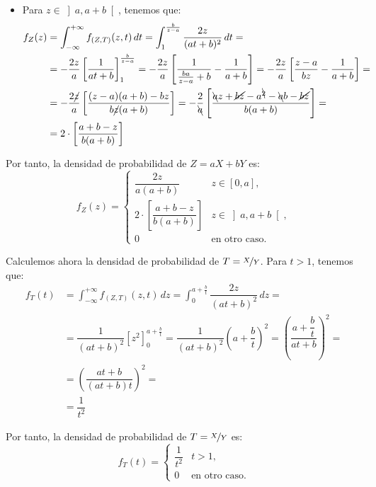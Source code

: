 \begin{ejercicio}
\begin{itemize}
        \item Para $z\in\left]a,a+b\right[$, tenemos que:
        \begin{align*}
            f_Z(z)&=\int_{-\infty}^{+\infty} f_{(Z,T)}(z, t) \, dt
            = \int_{1}^{\frac{b}{z-a}} \dfrac{2z}{(at+b)^2} \, dt
            =\\&= -\frac{2z}{a}\left[\dfrac{1}{at+b}\right]_{1}^{\frac{b}{z-a}}
            = -\frac{2z}{a}\left[\dfrac{1}{\frac{ba}{z-a}+b}-\dfrac{1}{a+b}\right]
            = -\frac{2z}{a}\left[\dfrac{z-a}{bz}-\dfrac{1}{a+b}\right]
            =\\&= -\frac{2\cancel{z}}{a}\left[\dfrac{(z-a)(a+b)-bz}{b\cancel{z}(a+b)}\right]
            = -\frac{2}{\bcancel{a}}\left[\dfrac{\bcancel{a}z+\cancel{bz}-a^{\bcancel{2}}-\bcancel{a}b-\cancel{bz}}{b(a+b)}\right]
            =\\&= 2\cdot \left[\dfrac{a+b-z}{b(a+b)}\right]
        \end{align*}
    \end{itemize}

    Por tanto, la densidad de probabilidad de $Z=aX+bY$ es:
    \begin{equation*}
        f_Z(z) = \begin{cases}
            \dfrac{2z}{a(a+b)} & z\in\left[0,a\right], \\
            2\cdot \left[\dfrac{a+b-z}{b(a+b)}\right] & z\in\left]a,a+b\right[, \\
            0 & \text{en otro caso}.
        \end{cases}
    \end{equation*}

    Calculemos ahora la densidad de probabilidad de $T=\nicefrac{X}{Y}$. Para $t>1$, tenemos que:
    \begin{align*}
        f_T(t)&=\int_{-\infty}^{+\infty} f_{(Z,T)}(z, t) \, dz
        = \int_{0}^{a+\frac{b}{t}} \dfrac{2z}{(at+b)^2} \, dz
        =\\&= \dfrac{1}{(at+b)^2}\left[z^2\right]_{0}^{a+\frac{b}{t}}
        = \dfrac{1}{(at+b)^2}\left(a+\dfrac{b}{t}\right)^2
        = \left(\dfrac{a+\dfrac{b}{t}}{at+b}\right)^2
        =\\&= \left(\dfrac{at+b}{(at+b)t}\right)^2
        =\\&= \dfrac{1}{t^2}
    \end{align*}

    Por tanto, la densidad de probabilidad de $T=\nicefrac{X}{Y}$ es:
    \begin{equation*}
        f_T(t) = \begin{cases}
            \dfrac{1}{t^2} & t>1, \\
            0 & \text{en otro caso}.
        \end{cases}
    \end{equation*}
\end{ejercicio}

